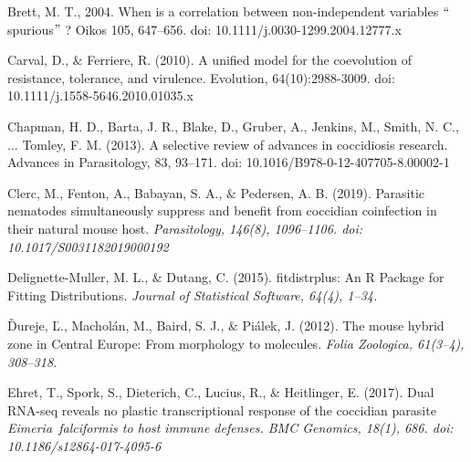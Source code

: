 \documentclass[12pt]{article}
\renewcommand{\_}{\kern-1.5pt\textunderscore\kern-1.5pt}
\begin{document}
\begin{FlushLeft}
\textcolor[HTML]{FF0000}{Brett, M. T., 2004. When is a correlation between non-independent variables $``$spurious$"$ ? Oikos 105, 647–656. doi: 10.1111/j.0030-1299.2004.12777.x}
\end{FlushLeft}\par

\begin{FlushLeft}
Carval, D., $\&$  Ferriere, R. (2010). A unified model for the coevolution of resistance, tolerance, and virulence. Evolution, 64(10):2988-3009. doi: 10.1111/j.1558-5646.2010.01035.x
\end{FlushLeft}\par

\begin{FlushLeft}
Chapman, H. D., Barta, J. R., Blake, D., Gruber, A., Jenkins, M., Smith, N. C., $ \ldots $  Tomley, F. M. (2013). A selective review of advances in coccidiosis research. Advances in Parasitology, 83, 93–171. doi: 10.1016/B978-0-12-407705-8.00002-1
\end{FlushLeft}\par

\begin{FlushLeft}
Clerc, M., Fenton, A., Babayan, S. A., $\&$  Pedersen, A. B. (2019). Parasitic nematodes simultaneously suppress and benefit from coccidian coinfection in their natural mouse host. \textit{Parasitology, 146(8), 1096–1106. doi: 10.1017/S0031182019000192}
\end{FlushLeft}\par

\begin{FlushLeft}
Delignette-Muller, M. L., $\&$  Dutang, C. (2015). fitdistrplus: An R Package for Fitting Distributions. \textit{Journal of Statistical Software, 64(4), 1–34.}
\end{FlushLeft}\par

\begin{FlushLeft}
Ďureje, Ľ., Macholán, M., Baird, S. J., $\&$  Piálek, J. (2012). The mouse hybrid zone in Central Europe: From morphology to molecules. \textit{Folia Zoologica, 61(3–4), 308–318.}
\end{FlushLeft}\par

\begin{FlushLeft}
Ehret, T., Spork, S., Dieterich, C., Lucius, R., $\&$  Heitlinger, E. (2017). Dual RNA-seq reveals no plastic transcriptional response of the coccidian parasite \textit{Eimeria falciformis to host immune defenses. BMC Genomics, 18(1), 686. doi: 10.1186/s12864-017-4095-6}
\end{FlushLeft}\par
\end{document}
